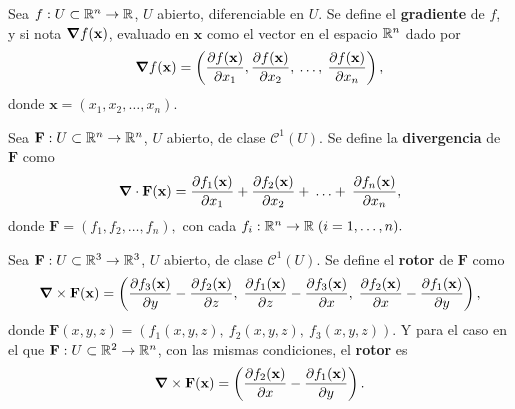 \begin{definition}
    Sea $f:U\subset\mathbb{R}^n\to\mathbb{R}$, $U$ abierto, diferenciable en $U$. Se define el \textbf{gradiente} de $f$, y si nota $\grad f(\mathbf{x})$, evaluado en $\mathbf{x}$ como el vector en el espacio $\mathbb{R}^n$ dado por 
    \[
        \grad f(\mathbf{x})=\left(\frac{\partial f(\mathbf{x})}{\partial x_1},\frac{\partial f(\mathbf{x})}{\partial x_2},\:\ldots,\: \frac{\partial f(\mathbf{x})}{\partial x_n}\right),
    \]
    donde $\mathbf{x}=(x_1, x_2,\ldots, x_n)$.   
\end{definition}
\begin{definition}
    Sea $\mathbf{F}:U\subset\mathbb{R}^n\to\mathbb{R}^n$, $U$ abierto, de clase $\mathcal{C}^1(U)$. Se define la \textbf{divergencia} de $\mathbf{F}$ como
    \[
        \grad\cdot \mathbf{F}(\mathbf{x})=\frac{\partial f_1(\mathbf{x})}{\partial x_1}+\frac{\partial f_2(\mathbf{x})}{\partial x_2}+\:\ldots+\: \frac{\partial f_n(\mathbf{x})}{\partial x_n},
    \]
    donde $\mathbf{F}=(f_1,f_2,\ldots,f_n),$ con cada $f_i:\mathbb{R}^n\to\mathbb{R}\;(i=1,\ldots,n).$
\end{definition}
\begin{definition}
    Sea $\mathbf{F}:U\subset\mathbb{R}^3\to\mathbb{R}^3$, $U$ abierto, de clase $\mathcal{C}^1(U)$. Se define el \textbf{rotor} de $\mathbf{F}$ como 
    \[
        \grad\times\mathbf{F}(\mathbf{x})=\left(\frac{\partial f_3(\mathbf{x})}{\partial y}-\frac{\partial f_2(\mathbf{x})}{\partial z},\;\frac{\partial f_1(\mathbf{x})}{\partial z}-\frac{\partial f_3(\mathbf{x})}{\partial x},\;\frac{\partial f_2(\mathbf{x})}{\partial x}-\frac{\partial f_1(\mathbf{x})}{\partial y}\right),
    \]   
    donde $\mathbf{F}(x,y,z)=(f_1(x,y,z),\:f_2(x,y,z),\:f_3(x,y,z))$.
    Y para el caso en el que $\mathbf{F}:U\subset\mathbb{R}^2\to\mathbb{R}^n$, con las mismas condiciones, el \textbf{rotor} es
    \[
        \grad\times\mathbf{F}(\mathbf{x})=\left(\frac{\partial f_2(\mathbf{x})}{\partial x}-\frac{\partial f_1(\mathbf{x})}{\partial y}\right).
    \]
\end{definition}


